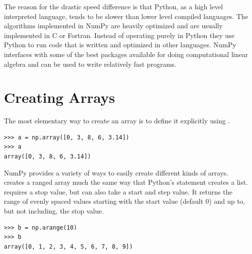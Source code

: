 % 
% 
% 
The reason for the drastic speed difference is that Python, as a high
level interpreted language, tends to be slower than lower level compiled
languages. The algorithms implemented in NumPy are heavily optimized and
are usually implemented in C or Fortran. Instead of operating purely in
Python they use Python to run code that is written and optimized in
other languages. NumPy interfaces with some of the best packages
available for doing computational linear algebra and can be used to
write relatively fast programs.


\section*{Creating Arrays} The most elementary way to create an array is
to define it explicitly using . 
\begin{lstlisting}
>>> a = np.array([0, 3, 8, 6, 3.14]) 
>>> a
array([0, 3, 8, 6, 3.14]) 
\end{lstlisting} 

NumPy provides a variety of
ways to easily create different kinds of arrays. 
creates a ranged array much the same way that Python's 
statement creates a list.  requires a
stop value, but can also take a start and step value. It returns the range
of evenly spaced values starting with the start value (default 0) and up to,
but not including, the stop value. 
\begin{lstlisting}
>>> b = np.arange(10) 
>>> b
array([0, 1, 2, 3, 4, 5, 6, 7, 8, 9]) 
\end{lstlisting}
 
